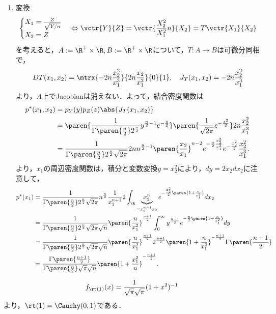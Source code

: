 \documentclass[uplatex,dvipdfmx]{jsreport}
\begin{document}
\begin{Proof}\mbox{}
    \begin{enumerate}
        \item 変換
        \[\begin{cases}
            X_1=\frac{Z}{\sqrt{Y/n}}\\
            X_2=Z
        \end{cases}\Leftrightarrow\vctr{Y}{Z}=\vctr{\frac{X_2^2}{X_1^2}n}{X_2}=T\vctr{X_1}{X_2}\]
        を考えると，$A:=\R^+\times\R,B:=\R^+\times\R$について，$T:A\to B$は可微分同相で，
        \[DT(x_1,x_2)=\mtrx{-2n\frac{x_2^2}{x_1^3}}{2n\frac{x_2}{x_1^2}}{0}{1},\quad J_T(x_1,x_2)=-2n\frac{x_2^2}{x_1^3}\]
        より，$A$上でJacobianは消えない．よって，結合密度関数は
        \begin{align*}
            p^*(x_1,x_2)&=p_Y(y)p_Z(z)\abs{J_T(x_1,x_2)}\\
            &=\paren{\frac{1}{\Gamma\paren{\frac{n}{2}}2^{\frac{n}{2}}}y^{\frac{n}{2}-1}e^{-\frac{y}{2}}}\paren{\frac{1}{\sqrt{2\pi}}e^{-\frac{z^2}{2}}}2n\frac{x_2^2}{x_1^3}\\
            &=\frac{1}{\Gamma\paren{\frac{n}{2}}2^{\frac{n}{2}}\sqrt{2\pi}}2nn^{\frac{n}{2}-1}\paren{\frac{x_2}{x_1}}^{n-2}e^{-\frac{n}{2}\frac{x_2^2}{x_1^2}}e^{-\frac{x_2^2}{2}}\frac{x_2^2}{x_1^3}.
        \end{align*}
        より，$x_1$の周辺密度関数は，積分と変数変換$y=x_2^2$により，$dy=2x_2dx_2$に注意して，
        \begin{align*}
            p^*(x_1)&=\frac{1}{\Gamma\paren{\frac{n}{2}}2^{\frac{n}{2}}\sqrt{2\pi}}n^{\frac{n}{2}}\frac{1}{x_1^{n+1}}2\int_\R \underbrace{x_2^n}_{=x_2^{n-1}x_2}e^{-\frac{x_2^2}{2}\paren{1+\frac{n}{x_1^2}}}dx_2\\
            &=\frac{1}{\Gamma\paren{\frac{n}{2}}2^{\frac{n}{2}}\sqrt{2\pi}\sqrt{n}}\paren{\frac{n}{x_1^2}}^{\frac{n+1}{2}}\int^\infty_0y^{\frac{n-1}{2}}e^{-\frac{y}{2}\paren{1+\frac{n}{x_1^2}}}dy\\
            &=\frac{1}{\Gamma\paren{\frac{n}{2}}2^{\frac{n}{2}}\sqrt{2\pi}\sqrt{n}}\paren{\frac{n}{x_1^2}}^{\frac{n+1}{2}}2^{\frac{n+1}{2}}\paren{1+\frac{n}{x_1^2}}^{-\frac{n+1}{2}}\Gamma\paren{\frac{n+1}{2}}\\
            &=\frac{\Gamma\paren{\frac{n+1}{2}}}{\Gamma\paren{\frac{n}{2}}\sqrt{\pi}\sqrt{n}}\paren{1+\frac{x_1^2}{n}}^{-\frac{n+1}{2}}.
        \end{align*}
    \end{enumerate}
\end{Proof}
\begin{remark}
    \[f_{\rt(1)}(x)=\frac{1}{\sqrt{\pi}\sqrt{\pi}}(1+x^2)^{-1}\]
    より，$\rt(1)=\Cauchy(0,1)$である．
\end{remark}
\end{document}
